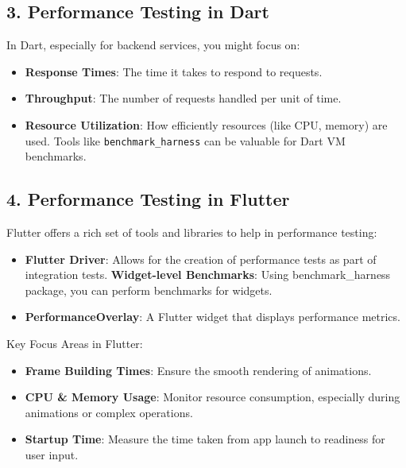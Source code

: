 \documentclass[
]{article}
\providecommand{\tightlist}{%
  \setlength{\itemsep}{0pt}\setlength{\parskip}{0pt}}
\begin{document}
\subsection{3. Performance Testing in
Dart}\label{performance-testing-in-dart}

In Dart, especially for backend services, you might focus on:

\begin{itemize}
\tightlist
\item
  \textbf{Response Times}: The time it takes to respond to requests.
\item
  \textbf{Throughput}: The number of requests handled per unit of time.
\item
  \textbf{Resource Utilization}: How efficiently resources (like CPU,
  memory) are used. Tools like \texttt{benchmark\_harness} can be
  valuable for Dart VM benchmarks.
\end{itemize}

\subsection{4. Performance Testing in
Flutter}\label{performance-testing-in-flutter}

Flutter offers a rich set of tools and libraries to help in performance
testing:

\begin{itemize}
\tightlist
\item
  \textbf{Flutter Driver}: Allows for the creation of performance tests
  as part of integration tests. \textbf{Widget-level Benchmarks}: Using
  benchmark\_harness package, you can perform benchmarks for widgets.
\item
  \textbf{PerformanceOverlay}: A Flutter widget that displays
  performance metrics.
\end{itemize}

Key Focus Areas in Flutter:

\begin{itemize}
\tightlist
\item
  \textbf{Frame Building Times}: Ensure the smooth rendering of
  animations.
\item
  \textbf{CPU \& Memory Usage}: Monitor resource consumption, especially
  during animations or complex operations.
\item
  \textbf{Startup Time}: Measure the time taken from app launch to
  readiness for user input.
\end{itemize}
\end{document}
